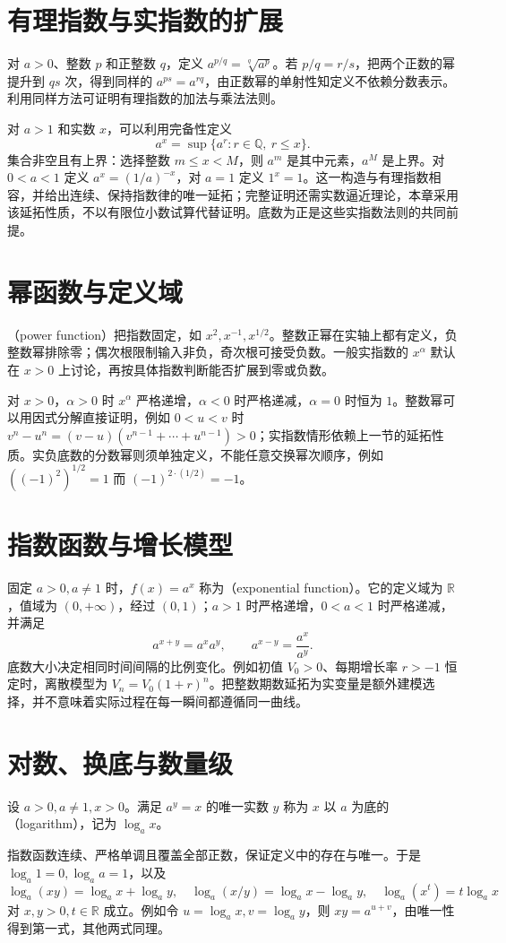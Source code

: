 \documentclass[UTF8]{ctexbook}
\begin{document}
\section{有理指数与实指数的扩展}
对 $a>0$、整数 $p$ 和正整数 $q$，定义 $a^{p/q}=\sqrt[q]{a^p}$。若 $p/q=r/s$，把两个正数的幂提升到 $qs$ 次，得到同样的 $a^{ps}=a^{rq}$，由正数幂的单射性知定义不依赖分数表示。利用同样方法可证明有理指数的加法与乘法法则。

对 $a>1$ 和实数 $x$，可以利用完备性定义
\[
 a^x=\sup\{a^r:r\in\mathbb Q,\ r\le x\}.
\]
集合非空且有上界：选择整数 $m\le x<M$，则 $a^m$ 是其中元素，$a^M$ 是上界。对 $0<a<1$ 定义 $a^x=(1/a)^{-x}$，对 $a=1$ 定义 $1^x=1$。这一构造与有理指数相容，并给出连续、保持指数律的唯一延拓；完整证明还需实数逼近理论，本章采用该延拓性质，不以有限位小数试算代替证明。底数为正是这些实指数法则的共同前提。

\section{幂函数与定义域}
（power function）把指数固定，如 $x^2,x^{-1},x^{1/2}$。整数正幂在实轴上都有定义，负整数幂排除零；偶次根限制输入非负，奇次根可接受负数。一般实指数的 $x^\alpha$ 默认在 $x>0$ 上讨论，再按具体指数判断能否扩展到零或负数。

对 $x>0$，$\alpha>0$ 时 $x^\alpha$ 严格递增，$\alpha<0$ 时严格递减，$\alpha=0$ 时恒为 $1$。整数幂可以用因式分解直接证明，例如 $0<u<v$ 时 $v^n-u^n=(v-u)(v^{n-1}+\cdots+u^{n-1})>0$；实指数情形依赖上一节的延拓性质。实负底数的分数幂则须单独定义，不能任意交换幂次顺序，例如 $((-1)^2)^{1/2}=1$ 而 $(-1)^{2\cdot(1/2)}=-1$。

\section{指数函数与增长模型}
固定 $a>0,a\ne1$ 时，$f(x)=a^x$ 称为（exponential function）。它的定义域为 $\mathbb R$，值域为 $(0,+\infty)$，经过 $(0,1)$；$a>1$ 时严格递增，$0<a<1$ 时严格递减，并满足
\[
 a^{x+y}=a^xa^y,\qquad a^{x-y}=\frac{a^x}{a^y}.
\]
底数大小决定相同时间间隔的比例变化。例如初值 $V_0>0$、每期增长率 $r>-1$ 恒定时，离散模型为 $V_n=V_0(1+r)^n$。把整数期数延拓为实变量是额外建模选择，并不意味着实际过程在每一瞬间都遵循同一曲线。

\section{对数、换底与数量级}
\begin{definition}
设 $a>0,a\ne1,x>0$。满足 $a^y=x$ 的唯一实数 $y$ 称为 $x$ 以 $a$ 为底的（logarithm），记为 $\log_a x$。
\end{definition}
指数函数连续、严格单调且覆盖全部正数，保证定义中的存在与唯一。于是 $\log_a1=0,\log_a a=1$，以及
\begin{equation}\label{eq:em-loglaws}
 \log_a(xy)=\log_a x+\log_a y,\quad
 \log_a(x/y)=\log_a x-\log_a y,\quad
 \log_a(x^t)=t\log_a x
\end{equation}
对 $x,y>0,t\in\mathbb R$ 成立。例如令 $u=\log_a x,v=\log_a y$，则 $xy=a^{u+v}$，由唯一性得到第一式，其他两式同理。
\end{document}
